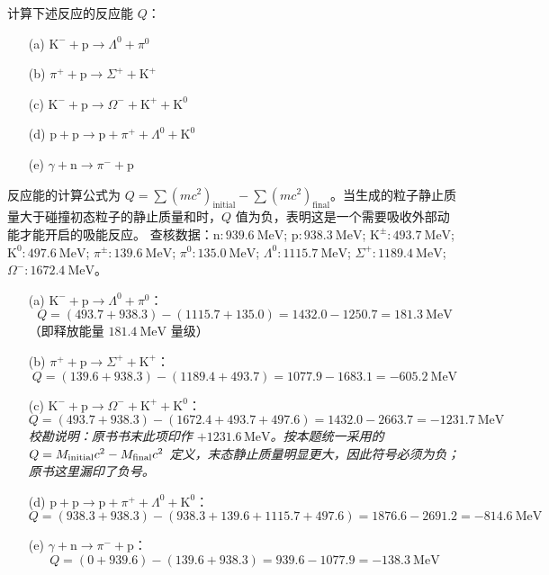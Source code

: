 \begin{exercise}\label{ex:30.15}
计算下述反应的反应能 $Q$：
\begin{enumerate}
  \item[(a)] $\mathrm{K}^- + \mathrm{p} \rightarrow \Lambda^0 + \pi^0$
  \item[(b)] $\pi^+ + \mathrm{p} \rightarrow \Sigma^+ + \mathrm{K}^+$
  \item[(c)] $\mathrm{K}^- + \mathrm{p} \rightarrow \Omega^- + \mathrm{K}^+ + \mathrm{K}^0$
  \item[(d)] $\mathrm{p} + \mathrm{p} \rightarrow \mathrm{p} + \pi^+ + \Lambda^0 + \mathrm{K}^0$
  \item[(e)] $\gamma + \mathrm{n} \rightarrow \pi^- + \mathrm{p}$
\end{enumerate}
\end{exercise}
\begin{solution}
反应能的计算公式为 $Q = \sum (mc^2)_{\text{initial}} - \sum (mc^2)_{\text{final}}$。当生成的粒子静止质量大于碰撞初态粒子的静止质量和时，$Q$ 值为负，表明这是一个需要吸收外部动能才能开启的吸能反应。
查核数据：$\mathrm{n}: 939.6 \ \mathrm{MeV}$; $\mathrm{p}: 938.3 \ \mathrm{MeV}$; $\mathrm{K}^\pm: 493.7 \ \mathrm{MeV}$; $\mathrm{K}^0: 497.6 \ \mathrm{MeV}$; $\pi^\pm: 139.6 \ \mathrm{MeV}$; $\pi^0: 135.0 \ \mathrm{MeV}$; $\Lambda^0: 1115.7 \ \mathrm{MeV}$; $\Sigma^+: 1189.4 \ \mathrm{MeV}$; $\Omega^-: 1672.4 \ \mathrm{MeV}$。

\begin{enumerate}
    \item[(a)] $\mathrm{K}^- + \mathrm{p} \rightarrow \Lambda^0 + \pi^0$：
    $$ Q = (493.7 + 938.3) - (1115.7 + 135.0) = 1432.0 - 1250.7 = 181.3 \ \mathrm{MeV} $$
    （即释放能量 $181.4 \ \mathrm{MeV}$ 量级）
    \item[(b)] $\pi^+ + \mathrm{p} \rightarrow \Sigma^+ + \mathrm{K}^+$：
    $$ Q = (139.6 + 938.3) - (1189.4 + 493.7) = 1077.9 - 1683.1 = -605.2 \ \mathrm{MeV} $$
    \item[(c)] $\mathrm{K}^- + \mathrm{p} \rightarrow \Omega^- + \mathrm{K}^+ + \mathrm{K}^0$：
    $$ Q = (493.7 + 938.3) - (1672.4 + 493.7 + 497.6) = 1432.0 - 2663.7 = -1231.7 \ \mathrm{MeV} $$
    \textit{校勘说明：原书书末此项印作 $+1231.6\,\mathrm{MeV}$。按本题统一采用的 $Q=M_{\rm initial}c^2-M_{\rm final}c^2$ 定义，末态静止质量明显更大，因此符号必须为负；原书这里漏印了负号。}
    \item[(d)] $\mathrm{p} + \mathrm{p} \rightarrow \mathrm{p} + \pi^+ + \Lambda^0 + \mathrm{K}^0$：
    $$ Q = (938.3 + 938.3) - (938.3 + 139.6 + 1115.7 + 497.6) = 1876.6 - 2691.2 = -814.6 \ \mathrm{MeV} $$
    \item[(e)] $\gamma + \mathrm{n} \rightarrow \pi^- + \mathrm{p}$：
    $$ Q = (0 + 939.6) - (139.6 + 938.3) = 939.6 - 1077.9 = -138.3 \ \mathrm{MeV} $$
\end{enumerate}
\end{solution}

